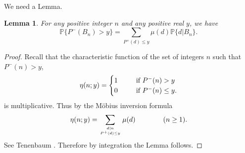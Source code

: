\documentclass[11pt,draft,reqno]{amsart}
\newtheorem{lemma}[theorem]{Lemma}
\theoremstyle{definition}
\theoremstyle{remarks}
\numberwithin{equation}{section}
\def \m{{\mu}}
\def \qq{{\qquad}}
\def\P{{\mathcal P}}
\def\P{{\mathbb P}}
\begin{document}
We need a Lemma.
 \begin{lemma} \label{l.eta(n;y)B}For any positive integer $n$ and any positive real $y$,
 we have
 \begin{equation*} \P\{P^-(B_n )> y\} =\sum_{  P^+(d )\le y} \m(d)\P\{ d|B_n \}
.
\end{equation*}
 \end{lemma}
 
 
\begin{proof} Recall that the characteristic function of the set of integers $n$ such that $P^-(n )> y$,
\begin{equation*}\eta(n;y) =\begin{cases} 1 \quad & \ \hbox{ if $P^-(n )> y$} \cr
0 \quad & \ \hbox{ if $P^-(n )\le  y$}.
\end{cases}
\end{equation*}
is multiplicative. Thus by the   M\"obius inversion formula
\begin{equation}\label{eta(n;y)}\eta(n;y) =\sum_{d|n\atop P^+(d )\le y} \m(d) \qq \qq (n\ge 1).
\end{equation}
 See  Tenenbaum \cite[p.\,395-396]{Te1}. 
  Therefore by integration the Lemma follows.   \end{proof}
\end{document}
